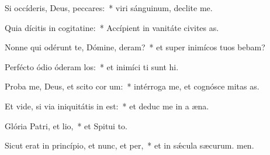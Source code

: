 \item Si occíderis, Deus, peccares:~* viri sánguinum, declite  me.
\item Quia dícitis in cogitatine:~* Accípient in vanitáte civites as.
\item Nonne qui odérunt te, Dómine, deram?~* et super inimícos tuos bebam?
\item Perfécto ódio óderam los:~* et inimíci ti sunt hi.
\item Proba me, Deus, et scito cor um:~* intérroga me, et cognósce mitas as.
\item Et vide, si via iniquitátis in  est:~* et deduc me in a æna.
\item Glória Patri, et lio,~* et Spitui to.
\item Sicut erat in princípio, et nunc, et per,~* et in sǽcula sæcurum. men.
